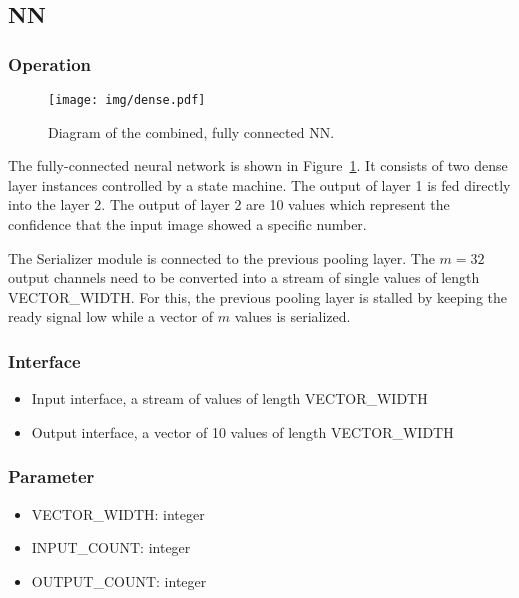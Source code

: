 \subsection{NN}

\subsubsection{Operation}

\begin{figure}[h]
	\centering
	\texttt{[image: img/dense.pdf]}
	\caption{Diagram of the combined, fully connected NN.}
	\label{FIG:nn}
\end{figure}

The fully-connected neural network is shown in Figure~\ref{FIG:nn}. It consists of two dense layer instances controlled by a state machine. The output of layer 1 is fed directly into the layer 2. The output of layer 2 are 10 values which represent the confidence that the input image showed a specific number. 

The Serializer module is connected to the previous pooling layer. The $m=32$ output channels need to be converted into a stream of single values of length VECTOR\_WIDTH. For this, the previous pooling layer is stalled by keeping the ready signal low while a vector of $m$ values is serialized.

\subsubsection{Interface}
\begin{itemize}
	\item Input interface, a stream of values of length VECTOR\_WIDTH
	\item Output interface, a vector of 10 values of length VECTOR\_WIDTH
\end{itemize}
\subsubsection{Parameter}
\begin{itemize}
	\item VECTOR\_WIDTH: integer
	\item INPUT\_COUNT: integer
	\item OUTPUT\_COUNT: integer
\end{itemize}